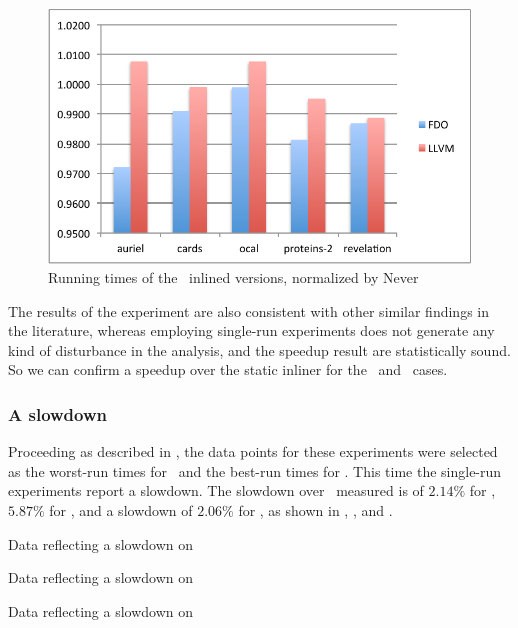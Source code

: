 \begin{figure}
  \centering
  \includegraphics[width=1.00\linewidth]{Figures/speedup}
  \caption{Running times of the \gzip\ inlined versions, normalized by Never}
  \label{fig:speedupz}
\end{figure}

The results of the experiment are also consistent with other similar findings in the literature, whereas employing single-run experiments does not generate any kind of disturbance in the analysis, and the speedup result are statistically sound. So we can confirm a speedup over the static inliner for the \bzip\ and \gzip\ cases.

\subsubsection{A slowdown}
\label{sec:slowdown}

Proceeding as described in , the data points for these experiments were selected as the worst-run times for \FDI\ and the best-run times for \llvm. This time the single-run experiments report a slowdown. The slowdown over \llvm\ measured is of $2.14 \%$ for \bzip, $5.87 \%$ for \gzip, and a slowdown of $2.06 \%$ for \gcc, as shown in , , and .

\begin{table}
  \centering
  \begin{tiny}
  
  \end{tiny}
  \caption{Data reflecting a slowdown on \bzip}
  \label{tab:slowdownb}
\end{table}

\begin{table}
  \centering
  \begin{tiny}
  
  \end{tiny}
  \caption{Data reflecting a slowdown on \gzip}
  \label{tab:slowdownz}
\end{table}

\begin{table}
  \centering
  \begin{tiny}
  
  \end{tiny}
  \caption{Data reflecting a slowdown on \gcc}
  \label{tab:slowdowngcc}
\end{table}
